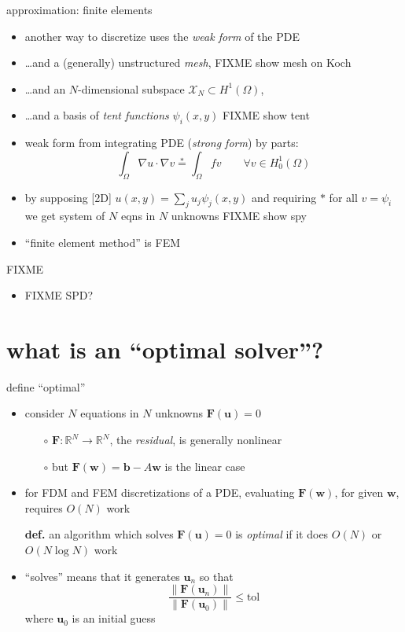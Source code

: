\documentclass[hide notes,intlimits,usenames,dvipsnames]{beamer}
\newcommand{\RR}{\mathbb{R}}
\newcommand{\grad}{\nabla}
\begin{document}
\begin{frame}{approximation: finite elements}
\begin{itemize}
\item another way to discretize uses the \emph{weak form} of the PDE
\item \dots and a (generally) unstructured \emph{mesh}, FIXME show mesh on Koch
\item \dots and an $N$-dimensional subspace $\mathcal{X}_N \subset H^1(\Omega)$,
\item \dots and a basis of \emph{tent functions} $\psi_i(x,y)$ FIXME show tent
\item weak form from integrating PDE (\emph{strong form}) by parts:
    $$\int_\Omega \grad u \cdot \grad v \stackrel{\ast}{=} \int_\Omega f v \qquad \forall v \in H_0^1(\Omega)$$
\item by supposing [2D] $u(x,y) = \sum_j u_{j} \psi_{j}(x,y)$ and requiring $\ast$ for all $v=\psi_i$ we get system of $N$ eqns in $N$ unknowns FIXME show spy
\item ``finite element method'' is FEM
\end{itemize}
\end{frame}


\begin{frame}{FIXME}
\begin{itemize}
\item FIXME  SPD?
\end{itemize}
\end{frame}


\section{what is an ``optimal solver''?}

\begin{frame}{define ``optimal''}
\begin{itemize}
\item consider $N$ equations in $N$ unknowns $\mathbf{F}(\mathbf{u}) = 0$
	\begin{itemize}
	\item[$\circ$] $\mathbf{F}:\RR^N \to \RR^N$, the \emph{residual}, is generally nonlinear
	\item[$\circ$] but $\mathbf{F}(\mathbf{w}) = \mathbf{b} - A \mathbf{w}$ is the linear case
	\end{itemize}
\item for FDM and FEM discretizations of a PDE, evaluating $\mathbf{F}(\mathbf{w})$, for given $\mathbf{w}$, requires $O(N)$ work

\bigskip
\indent \item[\textbf{def.}]  an algorithm which solves $\mathbf{F}(\mathbf{u}) = 0$ is \emph{optimal} if it does $O(N)$ or $O(N\log N)$ work

\bigskip
\item  ``solves'' means that it generates $\mathbf{u}_n$ so that
	    $$\frac{\|\mathbf{F}(\mathbf{u}_n)\|}{\|\mathbf{F}(\mathbf{u}_0)\|} \le \text{tol}$$
where $\mathbf{u}_0$ is an initial guess
\end{itemize}
\end{frame}
\end{document}
